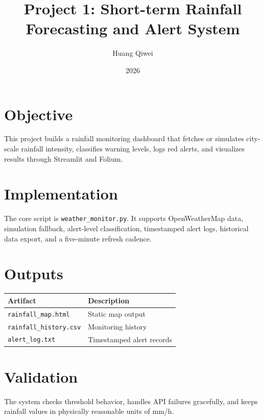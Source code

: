 \documentclass[11pt]{article}
\title{Project 1: Short-term Rainfall Forecasting and Alert System}
\author{Huang Qiwei}
\date{2026}
\begin{document}
\maketitle
\section*{Objective}
This project builds a rainfall monitoring dashboard that fetches or simulates city-scale rainfall intensity, classifies warning levels, logs red alerts, and visualizes results through Streamlit and Folium.
\section*{Implementation}
The core script is \texttt{weather\_monitor.py}. It supports OpenWeatherMap data, simulation fallback, alert-level classification, timestamped alert logs, historical data export, and a five-minute refresh cadence.
\section*{Outputs}
\begin{tabular}{ll}
\toprule
Artifact & Description \\
\midrule
\texttt{rainfall\_map.html} & Static map output \\
\texttt{rainfall\_history.csv} & Monitoring history \\
\texttt{alert\_log.txt} & Timestamped alert records \\
\bottomrule
\end{tabular}
\section*{Validation}
The system checks threshold behavior, handles API failures gracefully, and keeps rainfall values in physically reasonable units of mm/h.
\end{document}

